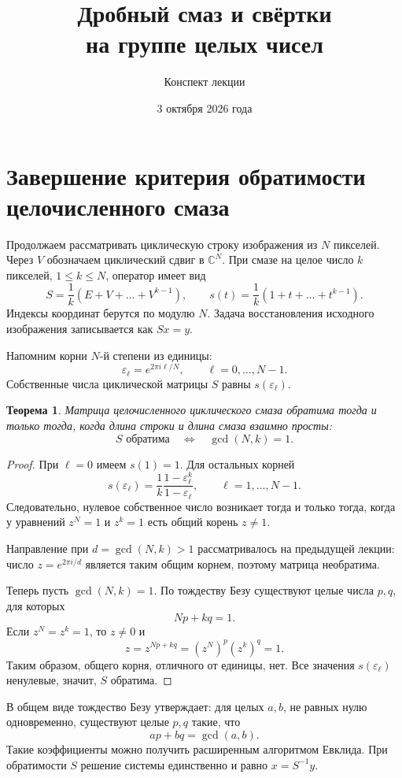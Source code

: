 \documentclass[12pt,a4paper]{article}
\title{Дробный смаз и свёртки\\на группе целых чисел}
\author{Конспект лекции}
\date{3 октября 2026 года}
\newtheorem{theorem}{Теорема}
\theoremstyle{definition}
\theoremstyle{remark}
\newcommand{\CC}{\mathbb{C}}
\newcommand{\eps}{\varepsilon}
\begin{document}
\maketitle

\section{Завершение критерия обратимости целочисленного смаза}

Продолжаем рассматривать циклическую строку изображения из $N$ пикселей.
Через $V$ обозначаем циклический сдвиг в $\CC^N$. При смазе на целое
число $k$ пикселей, $1\leqslant k\leqslant N$, оператор имеет вид
\[
  S=\frac1k(E+V+\dots+V^{k-1}),\qquad
  s(t)=\frac1k(1+t+\dots+t^{k-1}).
\]
Индексы координат берутся по модулю $N$. Задача восстановления
исходного изображения записывается как $Sx=y$.

Напомним корни $N$-й степени из единицы:
\[
  \eps_\ell=e^{2\pi i\ell/N},\qquad\ell=0,\dots,N-1.
\]
Собственные числа циклической матрицы $S$ равны $s(\eps_\ell)$.

\begin{theorem}
Матрица целочисленного циклического смаза обратима тогда и только тогда,
когда длина строки и длина смаза взаимно просты:
\[
  S\text{ обратима}\quad\Longleftrightarrow\quad\gcd(N,k)=1.
\]
\end{theorem}

\begin{proof}
При $\ell=0$ имеем $s(1)=1$. Для остальных корней
\[
  s(\eps_\ell)=\frac1k\frac{1-\eps_\ell^k}{1-\eps_\ell},
  \qquad\ell=1,\dots,N-1.
\]
Следовательно, нулевое собственное число возникает тогда и только
тогда, когда у уравнений $z^N=1$ и $z^k=1$ есть общий корень $z\ne1$.

Направление при $d=\gcd(N,k)>1$ рассматривалось на предыдущей лекции:
число $z=e^{2\pi i/d}$ является таким общим корнем, поэтому матрица
необратима.

Теперь пусть $\gcd(N,k)=1$. По тождеству Безу существуют целые числа
$p,q$, для которых
\[
  Np+kq=1.
\]
Если $z^N=z^k=1$, то $z\ne0$ и
\[
  z=z^{Np+kq}=(z^N)^p(z^k)^q=1.
\]
Таким образом, общего корня, отличного от единицы, нет. Все значения
$s(\eps_\ell)$ ненулевые, значит, $S$ обратима.
\end{proof}

В общем виде тождество Безу утверждает: для целых $a,b$, не равных нулю
одновременно, существуют целые $p,q$ такие, что
\[
  ap+bq=\gcd(a,b).
\]
Такие коэффициенты можно получить расширенным алгоритмом Евклида.
При обратимости $S$ решение системы единственно и равно $x=S^{-1}y$.
\end{document}
